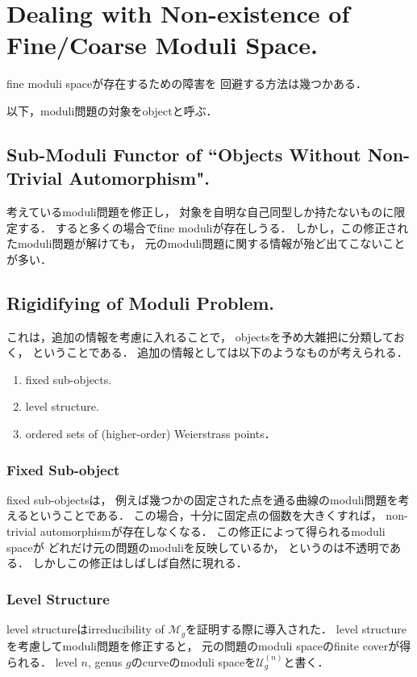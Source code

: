 \documentclass[a4paper]{jsarticle}
\newcommand{\spM}{\mathcal{U}}
\newcommand{\modM}{\mathcal{M}}
\begin{document}
\section{Dealing with Non-existence of Fine/Coarse Moduli Space.}
    fine moduli spaceが存在するための障害を
    回避する方法は幾つかある．
    
    以下，moduli問題の対象をobjectと呼ぶ．

    \subsection{Sub-Moduli Functor of ``Objects Without Non-Trivial Automorphism".}
    考えているmoduli問題を修正し，
    対象を自明な自己同型しか持たないものに限定する．
    すると多くの場合でfine moduliが存在しうる．
    しかし，この修正されたmoduli問題が解けても，
    元のmoduli問題に関する情報が殆ど出てこないことが多い．

    \subsection{Rigidifying of Moduli Problem.}
    これは，追加の情報を考慮に入れることで，
    objectsを予め大雑把に分類しておく，
    ということである．
    追加の情報としては以下のようなものが考えられる．
    \begin{enumerate}
        \item fixed sub-objects.
        \item level structure.
        \item ordered sets of (higher-order) Weierstrass points．
    \end{enumerate}

    \subsubsection{ Fixed Sub-object }
    fixed sub-objectsは，
    例えば幾つかの固定された点を通る曲線のmoduli問題を考えるということである．
    この場合，十分に固定点の個数を大きくすれば，
    non-trivial automorphismが存在しなくなる．
    この修正によって得られるmoduli spaceが
    どれだけ元の問題のmoduliを反映しているか，
    というのは不透明である．
    しかしこの修正はしばしば自然に現れる．

    \subsubsection{ Level Structure }
    level structureはirreducibility of $\modM_g$を証明する際に導入された．
    level structureを考慮してmoduli問題を修正すると，
    元の問題のmoduli spaceのfinite coverが得られる．
    level $n$, genus $g$のcurveのmoduli spaceを$\spM_g^{(n)}$と書く．
\end{document}
